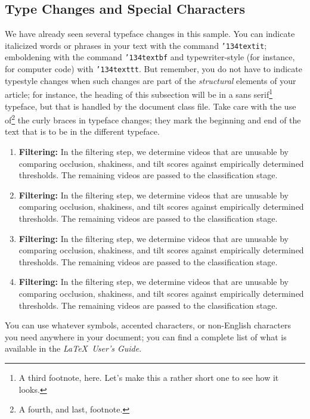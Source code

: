 \documentclass{sig-alternate}
\begin{document}
	\subsection{Type Changes and {\subsecit Special} Characters}
	We have already seen several typeface changes in this sample.  You
	can indicate italicized words or phrases in your text with
	the command \texttt{{\char'134}textit}; emboldening with the
	command \texttt{{\char'134}textbf}
	and typewriter-style (for instance, for computer code) with
	\texttt{{\char'134}texttt}.  But remember, you do not
	have to indicate typestyle changes when such changes are
	part of the \textit{structural} elements of your
	article; for instance, the heading of this subsection will
	be in a sans serif\footnote{A third footnote, here.
		Let's make this a rather short one to
		see how it looks.} typeface, but that is handled by the
	document class file. Take care with the use
	of\footnote{A fourth, and last, footnote.}
	the curly braces in typeface changes; they mark
	the beginning and end of
	the text that is to be in the different typeface.
	
	\begin{enumerate}
		\item \textbf{Filtering:} In the filtering step, we determine videos that are
		unusable by comparing occlusion, shakiness, and tilt scores
		against empirically determined thresholds. The remaining
		videos are passed to the classification stage.
		\item \textbf{Filtering:} In the filtering step, we determine videos that are
		unusable by comparing occlusion, shakiness, and tilt scores
		against empirically determined thresholds. The remaining
		videos are passed to the classification stage.
		\item \textbf{Filtering:} In the filtering step, we determine videos that are
		unusable by comparing occlusion, shakiness, and tilt scores
		against empirically determined thresholds. The remaining
		videos are passed to the classification stage.
		\item \textbf{Filtering:} In the filtering step, we determine videos that are
		unusable by comparing occlusion, shakiness, and tilt scores
		against empirically determined thresholds. The remaining
		videos are passed to the classification stage.
	\end{enumerate}
	
	You can use whatever symbols, accented characters, or
	non-English characters you need anywhere in your document;
	you can find a complete list of what is
	available in the \textit{\LaTeX\
		User's Guide}\cite{Lamport:LaTeX}.
	
\end{document}
